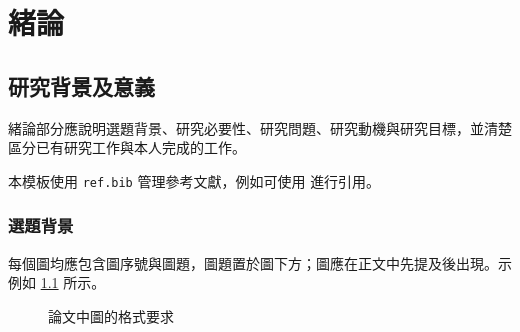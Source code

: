 \chapter{緒論}

\section{研究背景及意義}
緒論部分應說明選題背景、研究必要性、研究問題、研究動機與研究目標，並清楚區分已有研究工作與本人完成的工作。

本模板使用 \texttt{ref.bib} 管理參考文獻，例如可使用 \cite{lecun2015deep} 進行引用。

\subsection{選題背景}
每個圖均應包含圖序號與圖題，圖題置於圖下方；圖應在正文中先提及後出現。示例如 \cref{fig:format} 所示。

\begin{figure}[htbp]
  \centering
  \caption{論文中圖的格式要求}
  \label{fig:format}
\end{figure}
